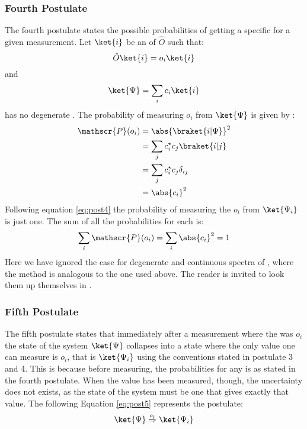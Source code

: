\documentclass[../master_thesis.tex]{subfiles}
\begin{document}
\subsubsection{Fourth Postulate}
The fourth postulate states the possible probabilities of getting a specific
\eival for a given measurement.
Let $\ket{i}$ be an \eifunc of $\hat{O}$ such that:
\begin{equation}
  \hat{O}\ket{i} = o_i\ket{i}
\end{equation}
and
\begin{equation}
  \ket{\Psi} = \sum_i c_i \ket{i} \label{eq:lincomb}
\end{equation}
has no degenerate \eival.
The probability of measuring \eival  $o_i$ from $\ket{\Psi}$ is given by
\cite{Cohen:1973}:
\begin{align} \label{eq:post4}
  \begin{split}
    \mathscr{P}(o_i) &= \abs{\braket{i|\Psi}}^2\\
                     &= \sum_{j}c_i^\star c_j\braket{i|j}\\
                     &= \sum_{j}c_i^\star c_j\delta_{ij}\\
                     &= \abs{c_i}^2
  \end{split}
\end{align}
Following equation \ref{eq:post4} the probability of measuring the
\eival $o_i$ from $\ket{\Psi_i}$ is just one. The sum of all the probabilities
for each \eival is:
\begin{equation}
  \sum_i\mathscr{P}(o_i) = \sum_i \abs{c_i}^2 = 1
\end{equation}
Here we have ignored the case for degenerate \eival and continuous spectra of
\eivals, where the method is analogous to the one used above. The reader is
invited to look them up themselves in \cite{Cohen:1973, Atkins:2011}.

\subsubsection{Fifth Postulate}
The fifth postulate states that immediately after a measurement where the \eival was $o_i$
the state of the system $\ket{\Psi}$ collapses into a state where the only value one
can measure is $o_i$, that is $ \ket{\Psi_i} $ using the conventions stated in postulate 3 and 4.
This is because before measuring, the probabilities for any \eival
is as stated in the fourth postulate. When the value has been measured, though,
the uncertainty does not exists, as the state of the system must be one that gives
exactly that value. The following Equation \ref{eq:post5} represents the
postulate:
\begin{equation}\label{eq:post5}
  \ket{\Psi} \stackrel{o_i}{\Rightarrow} \ket{\Psi_i}
\end{equation}
\end{document}
